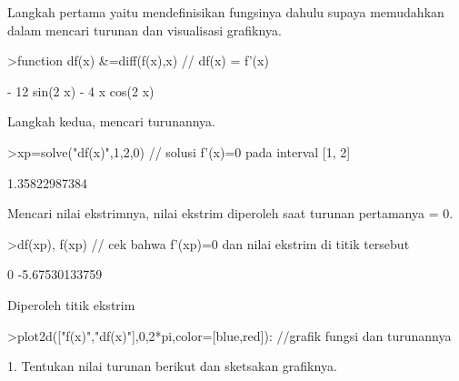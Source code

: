 \documentclass[a4paper,10pt]{article}
\begin{document}
\begin{eulernotebook}
\begin{eulercomment}
\begin{eulercomment}
\begin{eulercomment}
\begin{eulercomment}
\begin{eulercomment}
\begin{eulercomment}
\begin{eulercomment}
\begin{eulercomment}
\begin{eulercomment}
\begin{eulercomment}
\begin{eulercomment}
\begin{eulercomment}
\begin{eulercomment}
\begin{eulercomment}
\begin{eulercomment}
\begin{eulercomment}
\begin{eulercomment}
\begin{eulercomment}
\begin{eulercomment}
\begin{eulercomment}
\begin{eulercomment}
\begin{eulercomment}
\begin{eulercomment}
\begin{eulercomment}
\begin{euleroutput}
\end{euleroutput}
\begin{eulercomment}
Langkah pertama yaitu mendefinisikan fungsinya dahulu supaya
memudahkan dalam mencari turunan dan visualisasi grafiknya.
\end{eulercomment}
\begin{eulerprompt}
>function df(x) &=diff(f(x),x) // df(x) = f'(x)
\end{eulerprompt}
\begin{euleroutput}
  
                       - 12 sin(2 x) - 4 x cos(2 x)
  
\end{euleroutput}
\begin{eulercomment}
Langkah kedua, mencari turunannya.
\end{eulercomment}
\begin{eulerprompt}
>xp=solve("df(x)",1,2,0) // solusi f'(x)=0 pada interval [1, 2]
\end{eulerprompt}
\begin{euleroutput}
  1.35822987384
\end{euleroutput}
\begin{eulercomment}
Mencari nilai ekstrimnya, nilai ekstrim diperoleh saat turunan
pertamanya = 0.
\end{eulercomment}
\begin{eulerprompt}
>df(xp), f(xp) // cek bahwa f'(xp)=0 dan nilai ekstrim di titik tersebut
\end{eulerprompt}
\begin{euleroutput}
  0
  -5.67530133759
\end{euleroutput}
\begin{eulercomment}
Diperoleh titik ekstrim
\end{eulercomment}
\begin{eulerprompt}
>plot2d(["f(x)","df(x)"],0,2*pi,color=[blue,red]): //grafik fungsi dan turunannya
\end{eulerprompt}
\begin{eulercomment}
1. Tentukan nilai turunan berikut dan sketsakan grafiknya.\\

\end{eulercomment}
\end{eulercomment}
\end{eulercomment}
\end{eulercomment}
\end{eulercomment}
\end{eulercomment}
\end{eulercomment}
\end{eulercomment}
\end{eulercomment}
\end{eulercomment}
\end{eulercomment}
\end{eulercomment}
\end{eulercomment}
\end{eulercomment}
\end{eulercomment}
\end{eulercomment}
\end{eulercomment}
\end{eulercomment}
\end{eulercomment}
\end{eulercomment}
\end{eulercomment}
\end{eulercomment}
\end{eulercomment}
\end{eulercomment}
\end{eulercomment}
\end{eulernotebook}
\end{document}
